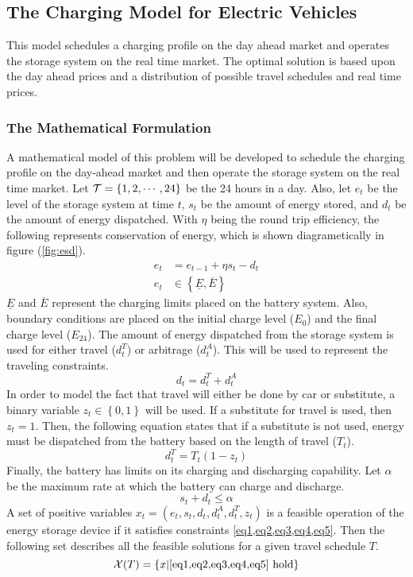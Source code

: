 \subsection{The Charging Model for Electric Vehicles}
\label{charge}
This model schedules a charging profile on the day ahead market and operates the storage system on the real time market.  The optimal solution is based upon the day ahead prices and a distribution of possible travel schedules and real time prices.  


\subsubsection{The Mathematical Formulation}
A mathematical model of this problem will be developed to schedule the charging profile on the day-ahead market and then operate the storage system on the real time market.  Let $\mathcal{T} = \left\{ 1, 2, \cdots, 24 \right\}$ be the 24 hours in a day.  Also, let $e_t$ be the level of the storage system at time $t$, $s_t$ be the amount of energy stored, and $d_t$ be the amount of energy dispatched.  With $\eta$ being the round trip efficiency, the following represents conservation of energy, which is shown diagrametically in figure (\ref{fig:esd}).  
\begin{align}
e_{t} &= e_{t-1} + \eta s_{t} - d_{t}	\label{eq1}\\
e_t  &\in \left\{ \underline{E} , \overline{E} \right\} \label{eq2} 
\end{align}
$\underline{E}$ and $\overline{E}$ represent the charging limits placed on the battery system.  Also, boundary conditions are placed on the initial charge level ($E_0$) and the final charge level ($E_{24}$).  The amount of energy dispatched from the storage system is used for either travel ($d^T_t$) or arbitrage ($d^A_t$).  This will be used to represent the traveling constraints.
\begin{equation}\label{eq3}
d_{t} = d^T_{t} + d^A_{t}
\end{equation}
In order to model the fact that travel will either be done by car or substitute, a binary variable $ z_{t}\in \left\{ 0, 1 \right\}$ will be used.  If a substitute for travel is used, then $z_t = 1$.  Then, the following equation states that if a substitute is not used, energy must be dispatched from the battery based on the length of travel ($T_t$).
\begin{equation}\label{eq4}
d^T_{t} = T_{t} ( 1 - z_{t} ) 
\end{equation}
Finally, the battery has limits on its charging and discharging capability.  Let $\alpha$ be the maximum rate at which the battery can charge and discharge.
\begin{equation}\label{eq5}
s_t + d_t \le \alpha
\end{equation}
A set of positive variables $x_t = (e_t, s_t, d_t, d^A_t, d^T_t, z_t)$ is a feasible operation of the energy storage device if it satisfies constraints \cref{eq1,eq2,eq3,eq4,eq5}.  Then the following set describes all the feasible solutions for a given travel schedule $T$.
\begin{equation}
\cX(T) = \left\{ x | \mbox{\cref{eq1,eq2,eq3,eq4,eq5} hold} \right\}
\end{equation}


